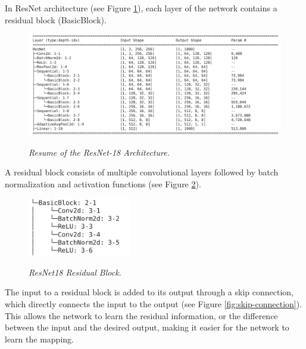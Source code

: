 In ResNet architecture (see Figure \ref{fig:resnet-18-arch}), each layer of the
network contains a residual block (BasicBlock).

\begin{figure}[H]
  \begin{adjustbox}{width=\textwidth, trim={0.2cm 0pt 1.5cm 0pt}, clip}
    \centering
    \includegraphics[width=\textwidth]{imatges/methodological_contribution/residual-blocks.png}
  \end{adjustbox}
  \caption[Resume of the ResNet-18 Architecture]{\textit{Resume of the
  ResNet-18 Architecture. }}
  {\label{fig:resnet-18-arch}}
\end{figure}

A residual block consists of multiple convolutional layers followed by batch
normalization and activation functions (see Figure
\ref{fig:resnet-18-residual-block}).

\newpage

\begin{figure}[H]
  \centering
  \includegraphics[width=0.4\textwidth]{imatges/methodological_contribution/basic-block.png}
  \caption[ResNet18 Residual Block]{\textit{ResNet18 Residual Block. }}
  {\label{fig:resnet-18-residual-block}}
\end{figure}

The input to a residual block is added to its output through a skip connection,
which directly connects the input to the output (see Figure
\ref{fig:skip-connection}). This allows the network to learn the residual
information, or the difference between the input and the desired output, making
it easier for the network to learn the mapping.

